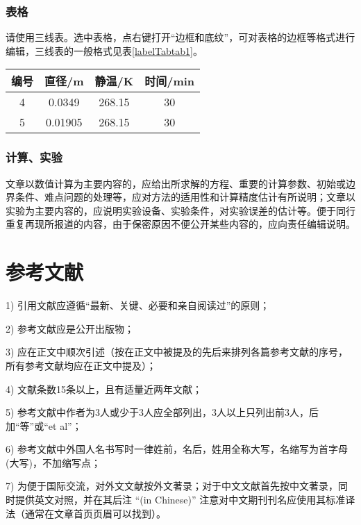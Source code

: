 \documentclass[10.5pt,twocolumn]{jbuaa}
\begin{document}
\subsubsection{表格}
请使用三线表。选中表格，点右键打开“边框和底纹”，可对表格的边框等格式进行编辑，三线表的一般格式见表\ref{labelTabtab1}。
\begin{table}[h]
\centering
\captionnamefont{\xiaowuhao\bf }
\captiontitlefont{\xiaowuhao\bf }
\renewcommand\tabcolsep{1em}
\begin{tabular}{cccc}
\toprule
{编号} &  {直径}/\si{\metre} & {静温}/\si{\kelvin} & {时间}/min\\
\midrule
4 & 0.0349 & 268.15 & 30\\
5 & 0.01905 & 268.15 & 30\\
\bottomrule
\end{tabular}
\end{table}

\subsubsection{计算、实验}
文章以数值计算为主要内容的，应给出所求解的方程、重要的计算参数、初始或边界条件、难点问题的处理等，应对方法的适用性和计算精度估计有所说明；文章以实验为主要内容的，应说明实验设备、实验条件，对实验误差的估计等。便于同行重复再现所报道的内容，由于保密原因不便公开某些内容的，应向责任编辑说明。

\section{参考文献}
1) 引用文献应遵循“最新、关键、必要和亲自阅读过”的原则；

2) 参考文献应是公开出版物；

3) 应在正文中顺次引述（按在正文中被提及的先后来排列各篇参考文献的序号，所有参考文献均应在正文中提及）；

4) 文献条数15条以上，且有适量近两年文献；

5) 参考文献中作者为3人或少于3人应全部列出，3人以上只列出前3人，后加“等”或“et al”；

6) 参考文献中外国人名书写时一律姓前，名后，姓用全称大写，名缩写为首字母(大写)，不加缩写点；

7) 为便于国际交流，对外文文献按外文著录；对于中文文献首先按中文著录，同时提供英文对照，并在其后注 “(in Chinese)” 注意对中文期刊刊名应使用其标准译法（通常在文章首页页眉可以找到）。
\end{document}
